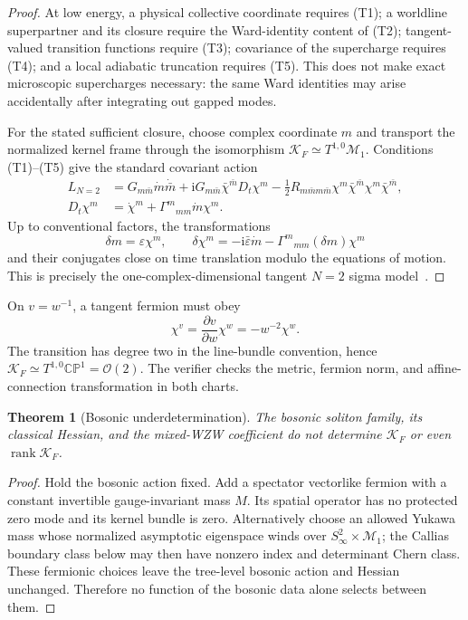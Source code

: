 \documentclass[11pt]{article}
\newtheorem{theorem}{Theorem}[section]
\theoremstyle{definition}
\theoremstyle{remark}
\newcommand{\ii}{\mathrm i}
\newcommand{\CP}{\mathbb {CP}}
\newcommand{\cO}{\mathcal O}
\newcommand{\cK}{\mathcal K}
\newcommand{\cM}{\mathcal M}
\begin{document}
\begin{proof}
At low energy, a physical collective coordinate requires (T1); a worldline
superpartner and its closure require the Ward-identity content of (T2);
tangent-valued transition functions require (T3); covariance of the
supercharge requires (T4); and a local adiabatic truncation requires (T5).
This does not make exact microscopic supercharges necessary: the same Ward
identities may arise accidentally after integrating out gapped modes.

For the stated sufficient closure, choose complex coordinate \(m\) and transport the normalized
kernel frame through the isomorphism \(\cK_F\simeq T^{1,0}\cM_1\).  Conditions
(T1)--(T5) give the standard covariant action
\begin{align}
 L_{N=2}
 &=G_{m\bar m}\dot m\dot{\bar m}
 +\ii G_{m\bar m}\bar\chi^{\bar m}D_t\chi^m
 -\frac12R_{m\bar m m\bar m}
 \chi^m\bar\chi^{\bar m}\chi^m\bar\chi^{\bar m},
 \label{eq:n2-action}\\
 D_t\chi^m
 &=\dot\chi^m+\Gamma^m{}_{mm}\dot m\chi^m.
 \label{eq:covariant-fermion}
\end{align}
Up to conventional factors, the transformations
\begin{equation}
 \delta m=\varepsilon\chi^m,
 \qquad
 \delta\chi^m=-\ii\bar\varepsilon\dot m
 -\Gamma^m{}_{mm}(\delta m)\chi^m
 \label{eq:susy-transform}
\end{equation}
and their conjugates close on time translation modulo the equations of
motion.  This is precisely the one-complex-dimensional tangent \(N=2\) sigma
model~\cite{Witten1982SameSoliton,AlvarezGaume1983SameSoliton}.
\end{proof}

On \(v=w^{-1}\), a tangent fermion must obey
\begin{equation}
 \chi^v=\frac{\partial v}{\partial w}\chi^w=-w^{-2}\chi^w.
 \label{eq:tangent-transition}
\end{equation}
The transition has degree two in the line-bundle convention, hence
\(\cK_F\simeq T^{1,0}\CP^1=\cO(2)\).  The verifier checks the metric,
fermion norm, and affine-connection transformation in both charts.

\begin{theorem}[Bosonic underdetermination]
The bosonic soliton family, its classical Hessian, and the mixed-WZW
coefficient do not determine \(\cK_F\) or even \(\operatorname{rank}\cK_F\).
\end{theorem}
\begin{proof}
Hold the bosonic action fixed.  Add a spectator vectorlike fermion with a
constant invertible gauge-invariant mass \(M\).  Its spatial operator has no
protected zero mode and its kernel bundle is zero.  Alternatively choose an
allowed Yukawa mass whose normalized asymptotic eigenspace winds over
\(S^2_\infty\times\cM_1\); the Callias boundary class below may then have
nonzero index and determinant Chern class.  These fermionic choices leave the
tree-level bosonic action and Hessian unchanged.  Therefore no function of
the bosonic data alone selects between them.
\end{proof}
\end{document}
